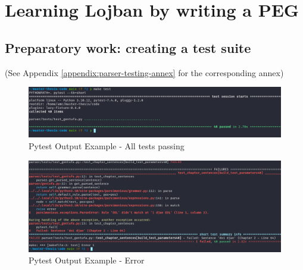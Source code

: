 \chapter{Learning Lojban by writing a PEG}

\section{Preparatory work: creating a test suite}
\label{sub:creating_a_test_suite}

(See Appendix \ref{appendix:parser-testing-annex} for the corresponding annex)

\begin{figure}[H]
\hspace{-1.1cm}
\includegraphics[scale=0.43]{images/pytest_output_pass.png}
\caption{Pytest Output Example - All tests passing}
\end{figure}

\begin{figure}[H]
\hspace{-2.2cm}
\includegraphics[scale=0.43]{images/pytest_output_fail.png}
\caption{Pytest Output Example - Error}
\end{figure}